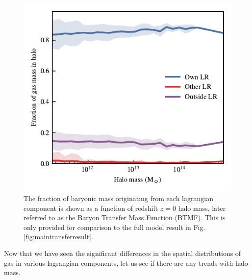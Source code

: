 \begin{figure}
	\centering
	\includegraphics[width=\columnwidth]{figures/s50gadget/component_fraction_vs_halo_mass_gas.pdf}
	\vspace{-0.7cm}
	\caption{
	The fraction of baryonic mass originating from each lagrangian component is
	shown as a function of redshift $z=0$ halo mass, later referred to as the
	Baryon Transfer Mass Function (BTMF). This is only provided for comparison to
	the full model result in Fig. \ref{fig:maintransferresult}.
	}
	\label{fig:nonradiativetransfer}
\end{figure}

Now that we have seen the significant differences in the spatial distributions
of gas in various lagrangian components, let us see if there are any trends
with halo mass.


